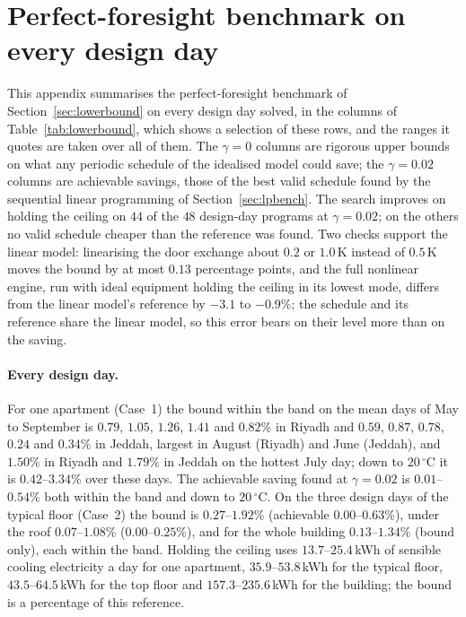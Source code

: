 \documentclass[10pt,a4paper,twocolumn]{article}
\theoremstyle{definition}
\begin{document}
\section{Perfect-foresight benchmark on every design day}\label{sec:S2benchmark}\label{app:S2}
This appendix summarises the perfect-foresight benchmark of Section~\ref{sec:lowerbound} on every design day solved, in the columns of Table~\ref{tab:lowerbound}, which shows a selection of these rows, and the ranges it quotes are taken over all of them. The $\gamma=0$ columns are rigorous upper bounds on what any periodic schedule of the idealised model could save; the $\gamma=0.02$ columns are achievable savings, those of the best valid schedule found by the sequential linear programming of Section~\ref{sec:lpbench}. The search improves on holding the ceiling on $44$ of the $48$ design-day programs at $\gamma=0.02$; on the others no valid schedule cheaper than the reference was found. Two checks support the linear model: linearising the door exchange about $0.2$ or $1.0\,$K instead of $0.5\,$K moves the bound by at most $0.13$ percentage points, and the full nonlinear engine, run with ideal equipment holding the ceiling in its lowest mode, differs from the linear model's reference by $-3.1$ to $-0.9\%$; the schedule and its reference share the linear model, so this error bears on their level more than on the saving.

\paragraph{Every design day.} For one apartment (Case~1) the bound within the band on the mean days of May to September is $0.79$, $1.05$, $1.26$, $1.41$ and $0.82$\% in Riyadh and $0.59$, $0.87$, $0.78$, $0.24$ and $0.34$\% in Jeddah, largest in August (Riyadh) and June (Jeddah), and $1.50\%$ in Riyadh and $1.79\%$ in Jeddah on the hottest July day; down to $20\,^{\circ}$C it is $0.42$--$3.34$\% over these days. The achievable saving found at $\gamma=0.02$ is $0.01$--$0.54$\% both within the band and down to $20\,^{\circ}$C. On the three design days of the typical floor (Case~2) the bound is $0.27$--$1.92$\% (achievable $0.00$--$0.63$\%), under the roof $0.07$--$1.08$\% ($0.00$--$0.25$\%), and for the whole building $0.13$--$1.34$\% (bound only), each within the band. Holding the ceiling uses $13.7$--$25.4$\,kWh of sensible cooling electricity a day for one apartment, $35.9$--$53.8$\,kWh for the typical floor, $43.5$--$64.5$\,kWh for the top floor and $157.3$--$235.6$\,kWh for the building; the bound is a percentage of this reference.
\end{document}
